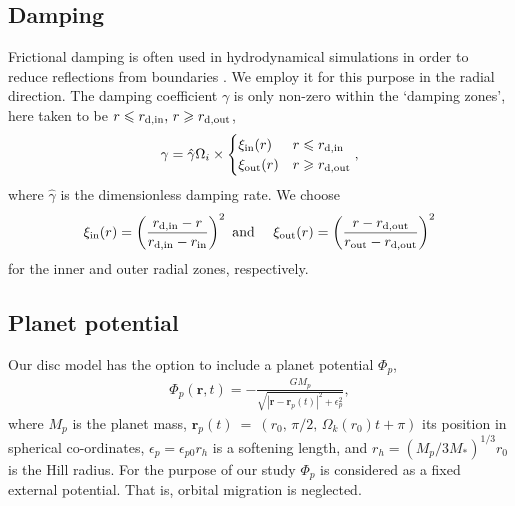 \subsection{Damping}
Frictional damping is often used in hydrodynamical simulations in order
to reduce reflections from boundaries
\citep[e.g.][]{bate02,valborro07}. We employ it for this  
purpose in the radial direction. The damping coefficient $\gamma$ is only 
non-zero within the `damping zones', here taken to be $r\leqslant r_\mathrm{d,in},\, 
r\geqslant r_\mathrm{d,out}$, 
\begin{align}
  \gamma = \hat{\gamma}\Omega_i\times
  \begin{cases}
    \xi_\mathrm{in}(r) & r\leqslant r_\mathrm{d,in} \\
    \xi_\mathrm{out}(r) & r\geqslant r_\mathrm{d,out} \\
  \end{cases},
\end{align}
where $\hat{\gamma}$ is the dimensionless damping rate. We choose
\begin{align}
\xi_\mathrm{in}(r) = \left(\frac{r_\mathrm{d,in} - r}{r_\mathrm{d,in} - r_\mathrm{in}}\right)^2 \text{ and } \quad
\xi_\mathrm{out}(r) = \left(\frac{r - r_\mathrm{d,out}}{r_\mathrm{out}- r_\mathrm{d,out}}\right)^2
\end{align}
for the inner and outer radial zones, respectively. 

\subsection{Planet potential}\label{planet}
Our disc model has the option to include a planet potential $\Phi_p$,
\begin{align}
  \Phi_p(\bm{r},t) = -\frac{GM_p}{\sqrt{|\bm{r}-\bm{r}_p(t)|^2 + \epsilon^2_p}},
\end{align}
where $M_p$ is the planet mass,
$\bm{r}_p(t)~=~(r_0,\,\pi/2,\,\Omega_k(r_0)t+\pi)$ its position in
spherical co-ordinates, $\epsilon_p = \epsilon_{p0}r_h$ is a
softening length, and $r_h=(M_p/3M_*)^{1/3}r_0$ is the Hill radius. 
For the purpose of our study $\Phi_p$ is considered as a 
fixed external potential. That is, orbital migration is neglected.  
